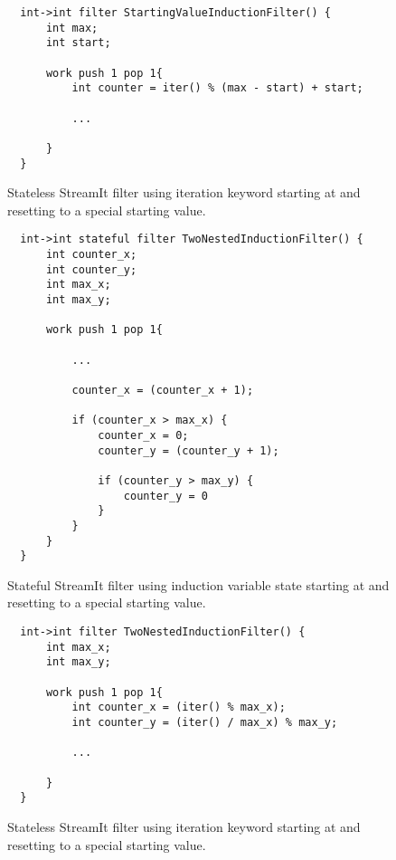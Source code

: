 \begin{figure}[t]
{\eightpoint
\begin{verbatim}
  int->int filter StartingValueInductionFilter() {
      int max;
      int start;
  
      work push 1 pop 1{
          int counter = iter() % (max - start) + start;

          ...

      }
  }
\end{verbatim}
\caption{Stateless StreamIt filter using iteration keyword starting at and resetting to a special starting value.\protect\label{fig:transform-after-starting}}}
\end{figure}

\begin{figure}[t]
{\eightpoint
\begin{verbatim}
  int->int stateful filter TwoNestedInductionFilter() {
      int counter_x;
      int counter_y;
      int max_x;
      int max_y;
  
      work push 1 pop 1{

          ...

          counter_x = (counter_x + 1);

          if (counter_x > max_x) {
              counter_x = 0;
              counter_y = (counter_y + 1);

              if (counter_y > max_y) {
                  counter_y = 0
              }
          } 
      }
  }
\end{verbatim}
\caption{Stateful StreamIt filter using induction variable state starting at and resetting to a special starting value.\protect\label{fig:transform-before-twonested}}}
\end{figure}

\begin{figure}[t]
{\eightpoint
\begin{verbatim}
  int->int filter TwoNestedInductionFilter() {
      int max_x;
      int max_y;
    
      work push 1 pop 1{
          int counter_x = (iter() % max_x);
          int counter_y = (iter() / max_x) % max_y;

          ...

      }
  }
\end{verbatim}
\caption{Stateless StreamIt filter using iteration keyword starting at and resetting to a special starting value.\protect\label{fig:transform-after-twonested}}}
\end{figure}

